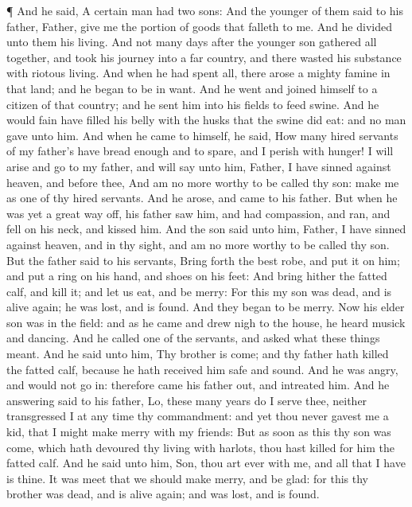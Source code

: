  ¶ And he said, A certain man had two sons: 
And the younger of them said to his father, Father, give me the portion
of goods that falleth to me. And he divided unto them his living.
 And not many days after the younger son gathered all
together, and took his journey into a far country, and there wasted his
substance with riotous living.  And when he had spent all,
there arose a mighty famine in that land; and he began to be in want.
 And he went and joined himself to a citizen of that
country; and he sent him into his fields to feed swine. 
And he would fain have filled his belly with the husks that the swine
did eat: and no man gave unto him.  And when he came to
himself, he said, How many hired servants of my father's have bread
enough and to spare, and I perish with hunger!  I will
arise and go to my father, and will say unto him, Father, I have sinned
against heaven, and before thee,  And am no more worthy to
be called thy son: make me as one of thy hired servants. 
And he arose, and came to his father. But when he was yet a great way
off, his father saw him, and had compassion, and ran, and fell on his
neck, and kissed him.  And the son said unto him, Father, I
have sinned against heaven, and in thy sight, and am no more worthy to
be called thy son.  But the father said to his servants,
Bring forth the best robe, and put it on him; and put a ring on his
hand, and shoes on his feet:  And bring hither the fatted
calf, and kill it; and let us eat, and be merry:  For this
my son was dead, and is alive again; he was lost, and is found. And they
began to be merry.  Now his elder son was in the field: and
as he came and drew nigh to the house, he heard musick and dancing.
 And he called one of the servants, and asked what these
things meant.  And he said unto him, Thy brother is come;
and thy father hath killed the fatted calf, because he hath received him
safe and sound.  And he was angry, and would not go in:
therefore came his father out, and intreated him.  And he
answering said to his father, Lo, these many years do I serve thee,
neither transgressed I at any time thy commandment: and yet thou never
gavest me a kid, that I might make merry with my friends: 
But as soon as this thy son was come, which hath devoured thy living
with harlots, thou hast killed for him the fatted calf. 
And he said unto him, Son, thou art ever with me, and all that I have is
thine.  It was meet that we should make merry, and be glad:
for this thy brother was dead, and is alive again; and was lost, and is
found.


